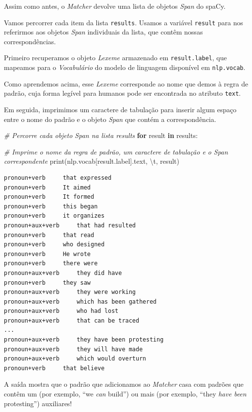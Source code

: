 \documentclass[
  brazilian,
]{article}
\newenvironment{Shaded}{}{}
\newcommand{\BuiltInTok}[1]{#1}
\newcommand{\CharTok}[1]{\textcolor[rgb]{0.25,0.44,0.63}{#1}}
\newcommand{\CommentTok}[1]{\textcolor[rgb]{0.38,0.63,0.69}{\textit{#1}}}
\newcommand{\ControlFlowTok}[1]{\textcolor[rgb]{0.00,0.44,0.13}{\textbf{#1}}}
\newcommand{\KeywordTok}[1]{\textcolor[rgb]{0.00,0.44,0.13}{\textbf{#1}}}
\newcommand{\NormalTok}[1]{#1}
\newcommand{\StringTok}[1]{\textcolor[rgb]{0.25,0.44,0.63}{#1}}
\begin{document}
Assim como antes, o \emph{Matcher} devolve uma lista de objetos
\emph{Span} do spaCy.

Vamos percorrer cada item da lista \texttt{results}. Usamos a variável
\texttt{result} para nos referirmos aos objetos \emph{Span} individuais
da lista, que contêm nossas correspondências.

Primeiro recuperamos o objeto \emph{Lexeme} armazenado em
\texttt{result.label}, que mapeamos para o \emph{Vocabulário} do modelo
de linguagem disponível em \texttt{nlp.vocab}.

Como aprendemos acima, esse \emph{Lexeme} corresponde ao nome que demos
à regra de padrão, cuja forma legível para humanos pode ser encontrada
no atributo \texttt{text}.

Em seguida, imprimimos um caractere de tabulação para inserir algum
espaço entre o nome do padrão e o objeto \emph{Span} que contém a
correspondência.

\begin{Shaded}
\begin{Highlighting}[]
\CommentTok{\# Percorre cada objeto Span na lista \textquotesingle{}results\textquotesingle{}}
\ControlFlowTok{for}\NormalTok{ result }\KeywordTok{in}\NormalTok{ results:}

    \CommentTok{\# Imprime o nome da regra de padrão, um caractere de tabulação e o Span correspondente}
    \BuiltInTok{print}\NormalTok{(nlp.vocab[result.label].text, }\StringTok{\textquotesingle{}}\CharTok{\textbackslash{}t}\StringTok{\textquotesingle{}}\NormalTok{, result)}
\end{Highlighting}
\end{Shaded}

\begin{verbatim}
pronoun+verb     that expressed
pronoun+verb     It aimed
pronoun+verb     It formed
pronoun+verb     this began
pronoun+verb     it organizes
pronoun+aux+verb     that had resulted
pronoun+verb     that read
pronoun+verb     who designed
pronoun+verb     He wrote
pronoun+verb     there were
pronoun+aux+verb     they did have
pronoun+verb     they saw
pronoun+aux+verb     they were working
pronoun+aux+verb     which has been gathered
pronoun+aux+verb     who had lost
pronoun+aux+verb     that can be traced
...
pronoun+aux+verb     they have been protesting
pronoun+aux+verb     they will have made
pronoun+aux+verb     which would overturn
pronoun+verb     that believe
\end{verbatim}

A saída mostra que o padrão que adicionamos ao \emph{Matcher} casa com
padrões que contêm um (por exemplo, ``we \emph{can} build'') ou mais
(por exemplo, ``they \emph{have been} protesting'') auxiliares!
\end{document}
